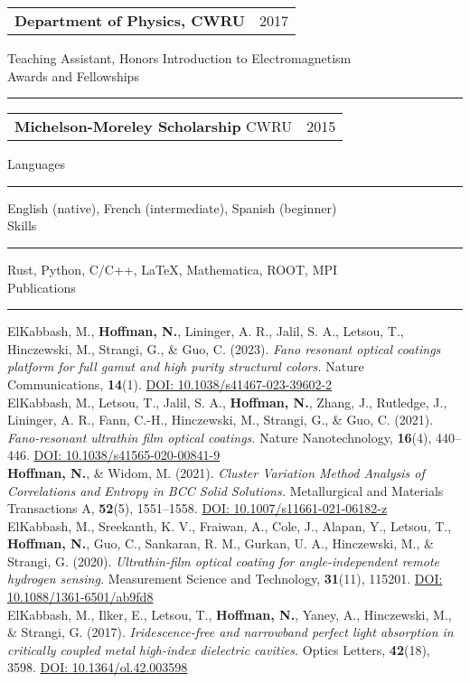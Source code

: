 \documentclass[letterpaper,11pt,oneside]{article}
\makeatletter
\newcommand{\datedentry}[2]{%
  \begin{tabular*}{\textwidth}{@{\extracolsep{\fill}} p{0.80\textwidth} r}
    #1 & #2 \\
  \end{tabular*}
}
\newcommand{\sectionheader}[1]{%
{\Large{#1}}
\vspace{2ex}
\hrule
\vspace{2ex}
}
\makeatother
\begin{document}
\datedentry{\textbf{Department of Physics, CWRU}}{2017\textendash 2019}
Teaching Assistant, Honors Introduction to Electromagnetism\\

\sectionheader{Awards and Fellowships}
\datedentry{\textbf{Michelson-Moreley Scholarship}
CWRU}{2015\textendash 2019}

\newpage

\sectionheader{Languages}
English (native), French (intermediate), Spanish (beginner)\\

\sectionheader{Skills}
Rust, Python, C/C++, \LaTeX, Mathematica, ROOT, MPI\\

\sectionheader{Publications}
ElKabbash, M., \textbf{Hoffman, N.}, Lininger, A. R., Jalil, S. A., Letsou, T., Hinczewski, M., Strangi, G., \& Guo, C. (2023). \textit{Fano resonant optical coatings platform for full gamut and high purity structural colors.} Nature Communications, \textbf{14}(1). \href{https://doi.org/10.1038/s41467-023-39602-2}{DOI: 10.1038/s41467-023-39602-2}\\

ElKabbash, M., Letsou, T., Jalil, S. A., \textbf{Hoffman, N.}, Zhang, J., Rutledge, J., Lininger, A. R., Fann, C.-H., Hinczewski, M., Strangi, G., \& Guo, C. (2021). \textit{Fano-resonant ultrathin film optical coatings.} Nature Nanotechnology, \textbf{16}(4), 440–446. \href{https://doi.org/10.1038/s41565-020-00841-9}{DOI: 10.1038/s41565-020-00841-9}\\

\textbf{Hoffman, N.}, \& Widom, M. (2021). \textit{Cluster Variation Method Analysis of Correlations and Entropy in BCC Solid Solutions.} Metallurgical and Materials Transactions A, \textbf{52}(5), 1551–1558. \href{https://doi.org/10.1007/s11661-021-06182-z}{DOI: 10.1007/s11661-021-06182-z}\\

ElKabbash, M., Sreekanth, K. V., Fraiwan, A., Cole, J., Alapan, Y., Letsou, T., \textbf{Hoffman, N.}, Guo, C., Sankaran, R. M., Gurkan, U. A., Hinczewski, M., \& Strangi, G. (2020). \textit{Ultrathin-film optical coating for angle-independent remote hydrogen sensing.} Measurement Science and Technology, \textbf{31}(11), 115201. \href{https://doi.org/10.1088/1361-6501/ab9fd8}{DOI: 10.1088/1361-6501/ab9fd8}\\

ElKabbash, M., Ilker, E., Letsou, T., \textbf{Hoffman, N.}, Yaney, A., Hinczewski, M., \& Strangi, G. (2017). \textit{Iridescence-free and narrowband perfect light absorption in critically coupled metal high-index dielectric cavities.} Optics Letters, \textbf{42}(18), 3598. \href{https://doi.org/10.1364/ol.42.003598}{DOI: 10.1364/ol.42.003598}\\
\end{document}
